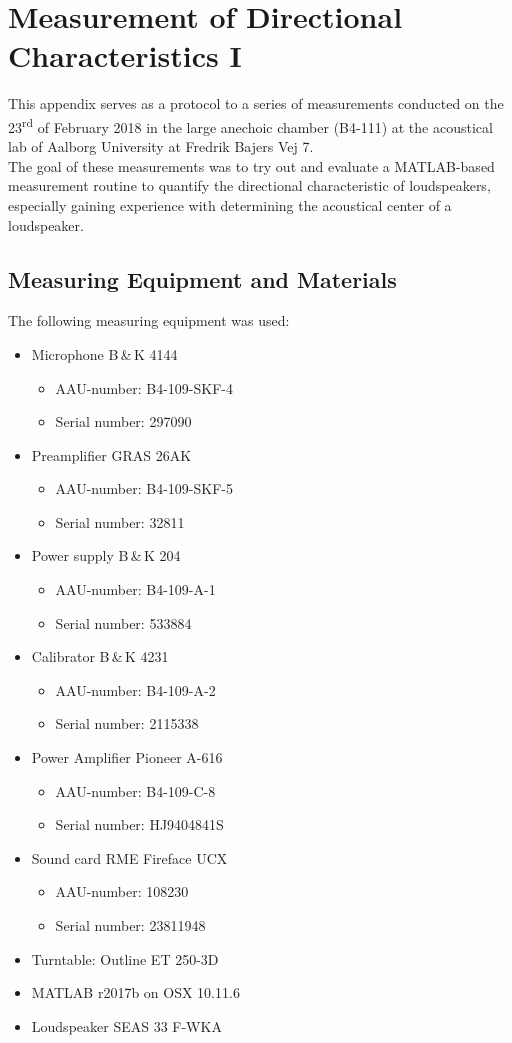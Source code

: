 \chapter{Measurement of Directional Characteristics I}\label{ax:directional_1}
This appendix serves as a protocol to a series of measurements conducted on the 23\textsuperscript{rd} of February 2018 in the large anechoic chamber (B4-111) at the acoustical lab of Aalborg University at Fredrik Bajers Vej 7.\\
The goal of these measurements was to try out and evaluate a MATLAB-based measurement routine to quantify the directional characteristic of loudspeakers, especially gaining experience with determining the acoustical center of a loudspeaker.

\section*{Measuring Equipment and Materials}
The following measuring equipment was used:
\begin{itemize}[noitemsep]
\item Microphone B\,\&\,K 4144
\begin{itemize}[noitemsep]
\item AAU-number: B4-109-SKF-4
\item Serial number: 297090
\end{itemize}
\item Preamplifier GRAS 26AK
\begin{itemize}[noitemsep]
\item AAU-number: B4-109-SKF-5
\item Serial number: 32811
\end{itemize}
\item Power supply B\,\&\,K 204
\begin{itemize}
\item AAU-number: B4-109-A-1
\item Serial number: 533884
\end{itemize}
\item Calibrator B\,\&\,K 4231
\begin{itemize}[noitemsep]
\item AAU-number: B4-109-A-2
\item Serial number: 2115338
\end{itemize}
\item Power Amplifier Pioneer A-616
\begin{itemize}[noitemsep]
\item AAU-number: B4-109-C-8
\item Serial number: HJ9404841S
\end{itemize}
\item Sound card RME Fireface UCX
\begin{itemize}[noitemsep]
\item AAU-number: 108230
\item Serial number: 23811948
\end{itemize}
\item Turntable: Outline ET 250-3D
\item MATLAB r2017b on OSX 10.11.6
\item Loudspeaker SEAS 33 F-WKA
\end{itemize}

